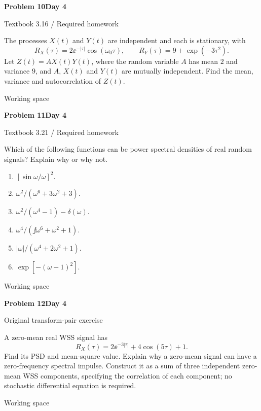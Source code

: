 \documentclass[11pt]{article}
\newcommand{\qtitle}[2]{\clearpage\begin{tcolorbox}[colback=navy,colframe=navy,arc=1.5pt,boxrule=0pt]\color{white}\large\bfseries #1\hfill\small #2\end{tcolorbox}}
\begin{document}
\qtitle{Problem 10}{Day 4}
{\small\color{accentred}Textbook 3.16 / Required homework}\par{}\par{}\par\smallskip\begin{tcolorbox}[colback=qbg,colframe=qbg,boxrule=0pt]The processes $X(t)$ and $Y(t)$ are independent and each is stationary, with
\[R_X(\tau)=2\ee^{-|\tau|}\cos(\omega_0\tau),\qquad R_Y(\tau)=9+\exp(-3\tau^2).\]
Let $Z(t)=AX(t)Y(t)$, where the random variable $A$ has mean $2$ and variance $9$, and $A$, $X(t)$ and $Y(t)$ are mutually independent. Find the mean, variance and autocorrelation of $Z(t)$.\end{tcolorbox}\smallskip\begin{workspace}\hfill{\color{linec}\footnotesize Working space}\end{workspace}
\qtitle{Problem 11}{Day 4}
{\small\color{accentred}Textbook 3.21 / Required homework}\par{}\par{}\par\smallskip\begin{tcolorbox}[colback=qbg,colframe=qbg,boxrule=0pt]Which of the following functions can be power spectral densities of real random signals? Explain why or why not.
\begin{enumerate}
\item $[\sin\omega/\omega]^2$.
\item $\omega^2/(\omega^6+3\omega^2+3)$.
\item $\omega^2/(\omega^4-1)-\delta(\omega)$.
\item $\omega^4/(\jj\omega^6+\omega^2+1)$.
\item $|\omega|/(\omega^4+2\omega^2+1)$.
\item $\exp[-(\omega-1)^2]$.
\end{enumerate}\end{tcolorbox}\smallskip\begin{workspace}\hfill{\color{linec}\footnotesize Working space}\end{workspace}
\qtitle{Problem 12}{Day 4}
{\small\color{accentred}Original transform-pair exercise}\par{}\par{}\par\smallskip\begin{tcolorbox}[colback=qbg,colframe=qbg,boxrule=0pt]A zero-mean real WSS signal has
\[R_X(\tau)=2\ee^{-3|\tau|}+4\cos(5\tau)+1.\]
Find its PSD and mean-square value. Explain why a zero-mean signal can have a zero-frequency spectral impulse. Construct it as a sum of three independent zero-mean WSS components, specifying the correlation of each component; no stochastic differential equation is required.\end{tcolorbox}\smallskip\begin{workspace}\hfill{\color{linec}\footnotesize Working space}\end{workspace}
\end{document}
